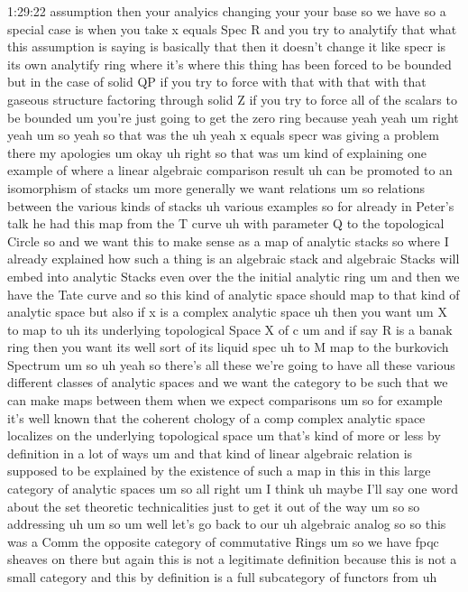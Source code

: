 \begin{unfinished}{1:29:22}
assumption then your analyics changing
your your base so we have so a special
case is when you take x equals Spec R
and you try to analytify that what this
assumption is saying is basically that
then it doesn't change it like specr is
its own
analytify ring where it's where this
thing has been forced to be bounded but
in the case of solid QP if you try to
force with that with that with that
gaseous structure factoring through
solid Z if you try to force all of the
scalars to be bounded um you're just
going to get the zero ring because
yeah yeah
um
right
yeah um so yeah so that was the
uh yeah x equals specr was giving a
problem there my
apologies
um
okay
uh right
so that was um kind of explaining one
example of where a linear algebraic
comparison result uh can be promoted to
an isomorphism of
stacks um more generally we want
relations um so
relations between the various kinds of
stacks uh various
examples so for already in Peter's talk
he had this map from the T
curve uh with parameter Q to the
topological Circle
so and we want this to make sense as a
map of analytic stacks
so where I already explained how such a
thing is an algebraic stack and
algebraic Stacks will embed into
analytic Stacks even over the the
initial analytic ring um and then we
have the Tate curve and so this kind of
analytic space should map to that kind
of analytic space but also if x is a
complex analytic
space uh then you want
um X to map
to uh its underlying topological Space X
of c
um and if say R is a banak
ring then you want its well sort of its
liquid spec uh to M map to the burkovich
Spectrum
um
so
uh yeah so there's all these we're going
to have all these various different
classes of analytic spaces and we want
the category to be such that we can make
maps between them when we expect
comparisons um so for example it's well
known that the coherent chology of a
comp complex analytic space localizes on
the underlying topological space um
that's kind of more or less by
definition in a lot of ways um and that
kind of linear algebraic relation is
supposed to be explained by the
existence of such a map in this in this
large category of analytic
spaces um so all right
um I
think
uh maybe I'll say one word about the set
theoretic technicalities just to get it
out of the way
um
so so addressing
uh
um
so um well let's go back to our
uh algebraic analog so so this was a
Comm the opposite category of
commutative
Rings um so we have fpqc sheaves on
there but again this is not a legitimate
definition because this is not a small
category and this by definition is a
full subcategory of functors from uh

\end{unfinished}
